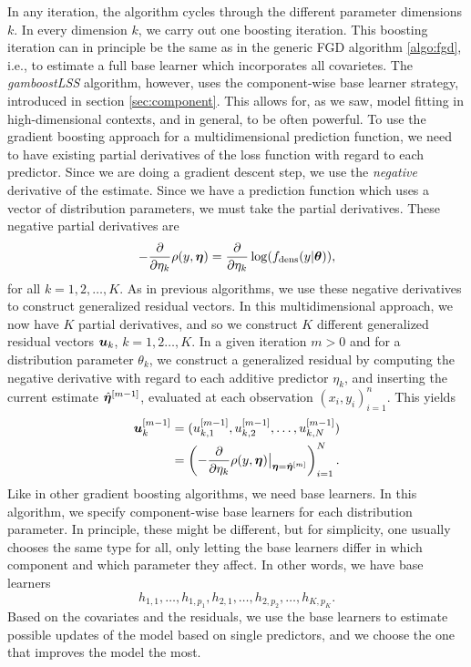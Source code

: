 In any iteration, the algorithm cycles through the different parameter dimensions $k$.
In every dimension $k$, we carry out one boosting iteration.
This boosting iteration can in principle be the same as in the generic FGD algorithm \eqref{algo:fgd}, i.e., to estimate a full base learner which incorporates all covarietes.
The \textit{gamboostLSS} algorithm, however, uses the component-wise base learner strategy, introduced in section \ref{sec:component}.
This allows for, as we saw, model fitting in high-dimensional contexts, and in general, to be often powerful.
To use the gradient boosting approach for a multidimensional prediction function, we need to have existing partial derivatives of the loss function with regard to each predictor.
Since we are doing a gradient descent step, we use the \textit{negative} derivative of the estimate.
Since we have a prediction function which uses a vector of distribution parameters, we must take the partial derivatives.
These negative partial derivatives are
\begin{equation*}
    -\frac{\partial}{\partial\eta_k}\rho(y,\boldsymbol{\eta})=\frac{\partial}{\partial\eta_k}\log(f_{\text{dens}}(y|\boldsymbol{\theta})),
\end{equation*}
for all $k=1,2,\ldots,K$. As in previous algorithms, we use these negative derivatives to construct generalized residual vectors.
In this multidimensional approach, we now have $K$ partial derivatives, and so we construct $K$ different generalized residual vectors $\bm{u}_k$, $k=1,2\ldots,K$.
In a given iteration $m>0$ and for a distribution parameter $\theta_k$, we construct a generalized residual by computing the negative derivative with regard to each additive predictor $\eta_k$, and inserting the current estimate $\hat{\boldsymbol{\eta}}^{[m-1]}$, evaluated at each observation $(x_i,y_i)_{i=1}^n$.
This yields
\begin{align*}
    \bm{u}_k^{[m-1]}&=(u_{k,1}^{[m-1]},u_{k,2}^{[m-1]},\ldots,u_{k,N}^{[m-1]})\\
    &=\left(-\frac{\partial}{\partial \eta_k}\rho(y,\boldsymbol{\eta})\big\rvert_{\boldsymbol{\eta}=\hat{\boldsymbol{\eta}}^{[m]}}\right)_{i=1}^N.
\end{align*}
Like in other gradient boosting algorithms, we need base learners.
In this algorithm, we specify component-wise base learners for each distribution parameter.
In principle, these might be different, but for simplicity, one usually chooses the same type for all, only letting the base learners differ in which component and which parameter they affect.
In other words, we have base learners
\begin{equation*}
    h_{1,1},\ldots,h_{1,p_1},h_{2,1},\ldots,h_{2,p_2},\ldots,h_{K,p_K}.
\end{equation*}
Based on the covariates and the residuals, we use the base learners to estimate possible updates of the model based on single predictors, and we choose the one that improves the model the most.

